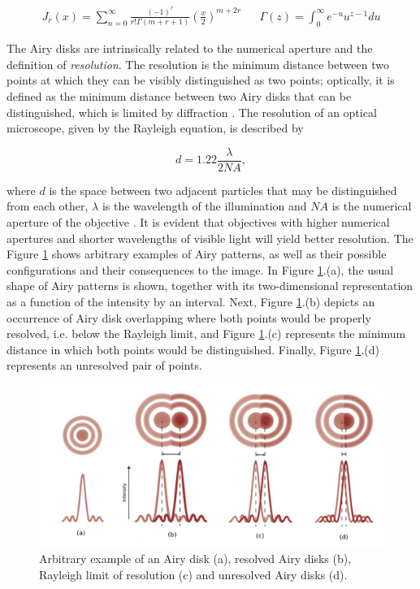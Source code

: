 \begin{align}
\label{eqn:1st_bessel}
J_{r}(x) = \sum_{n = 0}^{\infty}
            \frac{(-1)^{r}}
                 {r! \Gamma(m + r + 1)}
            \left(
                \frac{x}{2}
            \right)^{m + 2r}
&&
\Gamma(z) = \int_{0}^{\infty} e^{-u} u^{z-1}du
\end{align}

The Airy disks are intrinsically related to the numerical aperture and the definition of \emph{resolution}. The resolution is the minimum distance between two points at which they can be visibly distinguished as two points; optically, it is defined as the minimum distance between two Airy disks that can be distinguished, which is limited by diffraction \cite{leng2009materials}. The resolution of an optical microscope, given by the Rayleigh equation, is described by

\begin{equation}
\label{eqn:resolution}
d = 1.22 \frac{\lambda}{2 NA},
\end{equation}

\noindent where $d$ is the space between two adjacent particles that may be distinguished from each other, $\lambda$ is the wavelength of the illumination and $NA$ is the numerical aperture of the objective \cite{davidson2002optical}. It is evident that objectives with higher numerical apertures and shorter wavelengths of visible light will yield better resolution. The Figure \ref{fig:airy_disks} shows arbitrary examples of Airy patterns, as well as their possible configurations and their consequences to the image. In Figure \ref{fig:airy_disks}.(a), the usual shape of Airy patterns is shown, together with its two-dimensional representation as a function of the intensity by an interval. Next, Figure \ref{fig:airy_disks}.(b) depicts an occurrence of Airy disk overlapping where both points would be properly resolved, i.e. below the Rayleigh limit, and Figure \ref{fig:airy_disks}.(c) represents the minimum distance in which both points would be distinguished. Finally, Figure \ref{fig:airy_disks}.(d) represents an unresolved pair of points.

\begin{figure}[htb]
	\centering
	\caption{\label{fig:airy_disks} Arbitrary example of an Airy disk (a), resolved Airy disks (b), Rayleigh limit of resolution (c) and unresolved Airy disks (d).} 
	\begin{center}
	    \includegraphics[scale=0.4]{images/airy_disks.png}
	\end{center}
	\centering
\end{figure}

